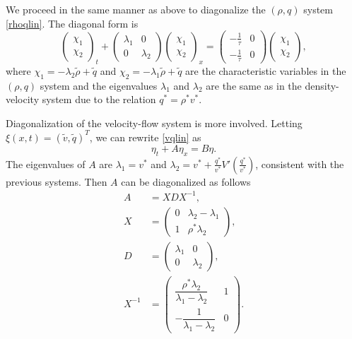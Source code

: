 \documentclass[preprint]{elsarticle}
\begin{document}
We proceed in the same manner as above to diagonalize the $(\rho,q)$ system \eqref{rhoqlin}. The diagonal form is
\begin{equation} \label{rhoqlindiag}
\begin{pmatrix}
\chi_1 \\ \chi_2
\end{pmatrix}_t 
+ \begin{pmatrix}
\lambda_1 & 0 \\
0 & \lambda_2
\end{pmatrix}
\begin{pmatrix}
\chi_1 \\ \chi_2
\end{pmatrix}_x
= \begin{pmatrix}
-\frac{1}{\tau} & 0 \\
-\frac{1}{\tau} & 0
\end{pmatrix}
\begin{pmatrix}
\chi_1 \\ \chi_2
\end{pmatrix},
\end{equation}
where $\chi_1 = -\lambda_2 \tilde{\rho} + \tilde{q}$ and $\chi_2 = -\lambda_1 \tilde{\rho} + \tilde{q}$ are the characteristic variables in the $(\rho,q)$ system and the eigenvalues $\lambda_1$ and $\lambda_2$ are the same as in the density-velocity system due to the relation $q^* = \rho^*v^*$. 

Diagonalization of the velocity-flow system is more involved. Letting $\xi(x,t) = (\tilde{v}, \tilde{q})^T$, we can rewrite \eqref{vqlin} as
\begin{equation} \label{vqlinxi}
\eta_t + A\eta_x = B\eta.
\end{equation}
The eigenvalues of $A$ are $\lambda_1 = v^*$ and $\lambda_2 = v^* + \frac{q^*}{v^*} V'\left(\frac{q^*}{v^*}\right)$, consistent with the previous systems. Then $A$ can be diagonalized as follows
\begin{align}
A &= XDX^{-1}, \\
X &= \begin{pmatrix}
0 & \lambda_2-\lambda_1 \\
1 & \rho^*\lambda_2
\end{pmatrix}, \\
D &= \begin{pmatrix}
\lambda_1 & 0 \\
0 & \lambda_2
\end{pmatrix},\\
X^{-1} &= \begin{pmatrix}
\dfrac{\rho^*\lambda_2}{\lambda_1 - \lambda_2} & 1 \\
-\dfrac{1}{\lambda_1 - \lambda_2} & 0
\end{pmatrix}.
\end{align}
\end{document}
